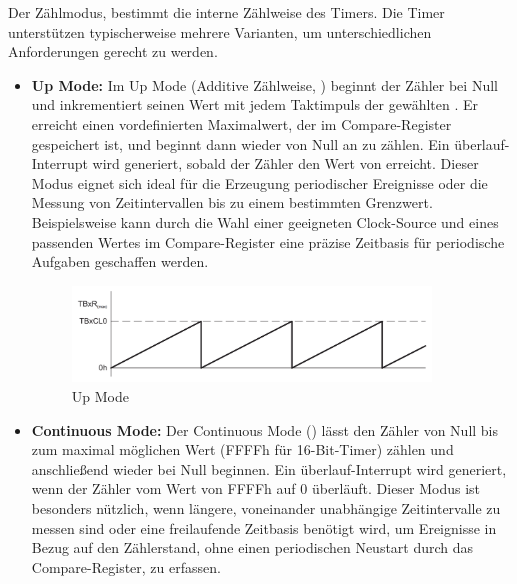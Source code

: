 Der Z\"ahlmodus, bestimmt die interne Z\"ahlweise des Timers. Die Timer unterst\"utzen typischerweise mehrere Varianten, um unterschiedlichen Anforderungen gerecht zu werden. 

\begin{itemize}
	\item \textbf{Up Mode:} Im Up Mode (Additive Z\"ahlweise, \Vgl {}) beginnt der Z\"ahler bei Null und inkrementiert seinen Wert mit jedem Taktimpuls der gew\"ahlten . Er erreicht einen vordefinierten Maximalwert, der im Compare-Register gespeichert ist, und beginnt dann wieder von Null an zu z\"ahlen. Ein \"uberlauf-Interrupt wird generiert, sobald der Z\"ahler den Wert von  erreicht. Dieser Modus eignet sich ideal f\"ur die Erzeugung periodischer Ereignisse oder die Messung von Zeitintervallen bis zu einem bestimmten Grenzwert. Beispielsweise kann durch die Wahl einer geeigneten Clock-Source und eines passenden Wertes im Compare-Register eine pr\"azise Zeitbasis f\"ur periodische Aufgaben geschaffen werden. \\
	
	\vspace{1.1cm}
	\begin{figure}[h!]
		\centering
		\includegraphics[width=0.9\textwidth]{../Bilder/up_mode.png}
		\caption{Up Mode }
		\label{fig:up_mode}
	\end{figure}
	
	\newpage
	\item \textbf{Continuous Mode:} Der Continuous Mode (\Vgl {}) l\"asst den Z\"ahler von Null bis zum maximal m\"oglichen Wert (FFFFh f\"ur 16-Bit-Timer) z\"ahlen und anschlie{\ss}end wieder bei Null beginnen. Ein \"uberlauf-Interrupt wird generiert, wenn der Z\"ahler vom Wert von FFFFh auf 0 \"uberl\"auft.  Dieser Modus ist besonders n\"utzlich, wenn l\"angere, voneinander unabh\"angige Zeitintervalle zu messen sind oder eine freilaufende Zeitbasis ben\"otigt wird, um Ereignisse in Bezug auf den Z\"ahlerstand, ohne einen periodischen Neustart durch das Compare-Register, zu erfassen. 
	

\end{itemize}
